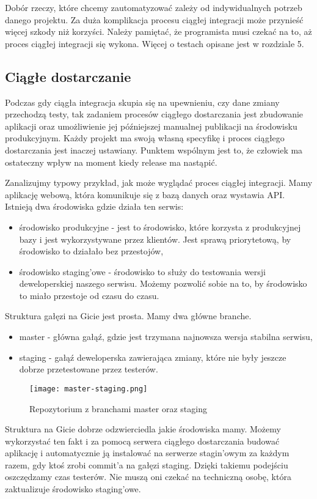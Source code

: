 Dobór rzeczy, które chcemy zautomatyzować zależy od indywidualnych potrzeb danego projektu. Za duża komplikacja procesu ciągłej integracji może przynieść więcej szkody niż korzyści. Należy pamiętać, że programista musi czekać na to, aż proces ciągłej integracji się wykona.
Więcej o testach opisane jest w rozdziale 5.
\subsection{Ciągłe dostarczanie}
Podczas gdy ciągła integracja skupia się na upewnieniu, czy dane zmiany przechodzą testy, tak zadaniem procesów ciągłego dostarczania jest zbudowanie aplikacji oraz umożliwienie jej późniejszej manualnej publikacji na środowisku produkcyjnym. Każdy projekt ma swoją własną specyfikę i proces ciągłego dostarczania jest inaczej ustawiany. Punktem wspólnym jest to, że człowiek ma ostateczny wpływ na moment kiedy release ma nastąpić.
\par
Zanalizujmy typowy przykład, jak może wyglądać proces ciągłej integracji. Mamy aplikację webową, która komunikuje się z bazą danych oraz wystawia API. Istnieją dwa środowiska gdzie działa ten serwis:
\begin{itemize}
    \item środowisko produkcyjne - jest to środowisko, które korzysta z produkcyjnej bazy i jest wykorzystywane przez klientów. Jest sprawą priorytetową, by środowisko to działało bez przestojów,
    \item środowisko staging'owe - środowisko to służy do testowania wersji deweloperskiej naszego serwisu. Możemy pozwolić sobie na to, by środowisko to miało przestoje od czasu do czasu.
\end{itemize}
Struktura gałęzi na Gicie jest prosta. Mamy dwa główne branche.
\begin{itemize}
    \item master - główna gałąź, gdzie jest trzymana najnowsza wersja stabilna serwisu,
    \item staging - gałąź deweloperska zawierająca zmiany, które nie były jeszcze dobrze przetestowane przez testerów.
\end{itemize}
\begin{figure}[htbp]
    \centering
    \texttt{[image: master-staging.png]}
    \caption{Repozytorium z branchami master oraz staging}
    \label{fig:git}
\end{figure}
Struktura na Gicie dobrze odzwierciedla jakie środowiska mamy. Możemy wykorzystać ten fakt i za pomocą serwera ciągłego dostarczania budować aplikację i automatycznie ją instalować na serwerze stagin'owym za każdym razem, gdy ktoś zrobi commit'a na gałęzi staging. Dzięki takiemu podejściu oszczędzamy czas testerów. Nie muszą oni czekać na techniczną osobę, która zaktualizuje środowisko staging'owe. 
